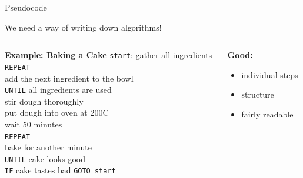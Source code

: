 \begin{frame}{Pseudocode}

    We need a way of writing down algorithms!
    \pause


    \begin{columns}[totalwidth=\textwidth]

    \begin{column}{0.6\textwidth}

        \begin{exampleblock}{\textbf{Example: Baking a Cake}}
            \small{
            \texttt{start}: gather all ingredients \\
            \vspace{0.1cm}
            \texttt{REPEAT} \\
                \-\hspace{1cm} add the next ingredient to the bowl \\
            \texttt{UNTIL} all ingredients are used \\
            \vspace{0.1cm}
            stir dough thoroughly \\
            put dough into oven at 200\degree C \\
            wait 50 minutes \\
            \vspace{0.1cm}
            \texttt{REPEAT} \\
                \-\hspace{1cm} bake for another minute \\
            \texttt{UNTIL} cake looks good \\
            \vspace{0.1cm}
            \texttt{IF} cake tastes bad \texttt{GOTO start} \\
            }
        \end{exampleblock}

    \end{column}

    \pause

    \begin{column}{0.35\textwidth}

        \textbf{Good:}
        \begin{itemize}
            \item individual steps
            \item structure
            \item fairly readable
        \end{itemize}


\end{column}
\end{columns}
\end{frame}
